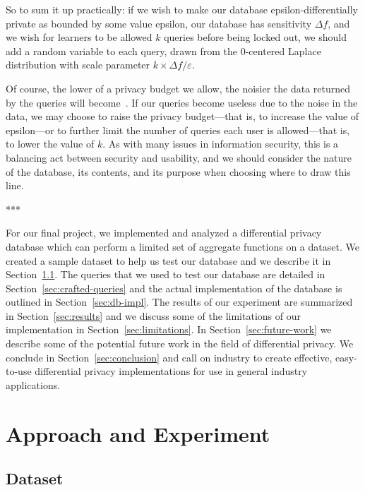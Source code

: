 \documentclass[conference,11pt]{IEEEtran}
\begin{document}
So to sum it up practically: if we wish to make our database
epsilon-differentially private as bounded by some value epsilon, our database
has sensitivity ${\Delta}f$, and we wish for learners to be allowed $k$ queries
before being locked out, we should add a random variable to each query, drawn
from the 0-centered Laplace distribution with scale parameter $k \times
{\Delta}f/\varepsilon$.

Of course, the lower of a privacy budget we allow, the noisier the data returned
by the queries will become~\cite{Atockar:2014}. If our queries become useless
due to the noise in the data, we may choose to raise the privacy budget---that
is, to increase the value of epsilon---or to further limit the number of queries
each user is allowed---that is, to lower the value of $k$. As with many issues
in information security, this is a balancing act between security and usability,
and we should consider the nature of the database, its contents, and its purpose
when choosing where to draw this line.

\begin{center}***\end{center}

For our final project, we implemented and analyzed a differential privacy
database which can perform a limited set of aggregate functions on a dataset. We
created a sample dataset to help us test our database and we describe it in
Section~\ref{sec:dataset}. The queries that we used to test our database are
detailed in Section~\ref{sec:crafted-queries} and the actual implementation of
the database is outlined in Section~\ref{sec:db-impl}. The results of our
experiment are summarized in Section~\ref{sec:results} and we discuss some of
the limitations of our implementation in Section~\ref{sec:limitations}. In
Section~\ref{sec:future-work} we describe some of the potential future work in
the field of differential privacy. We conclude in Section~\ref{sec:conclusion}
and call on industry to create effective, easy-to-use differential privacy
implementations for use in general industry applications.

\section{Approach and Experiment}
\subsection{Dataset}\label{sec:dataset}
\end{document}
